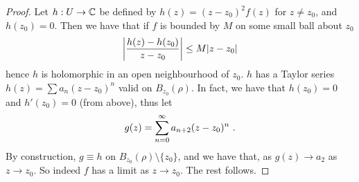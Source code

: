 \begin{proof}
  Let $h : U \rightarrow \CC$ be defined by $h(z)= (z - z_0)^2f(z)$ for $z \neq z_0$, and $h(z_0) = 0$.
Then we have that if $f$ is bounded by $M$ on some small ball about $z_0$
\[
  \abs*{\frac{h(z) - h(z_0)}{z - z_0}} \leq M \abs{z - z_0}
\]
hence $h$ is holomorphic in an open neighbourhood of $z_0$.
$h$ has a Taylor series $h(z) = \sum a_n (z - z_0)^n$ valid on $B_{z_0}(\rho)$.
In fact, we have that $h(z_0) = 0$ and $h'(z_0) = 0$ (from above), thus let
\[
g(z) = \sum_{n=0}^\infty a_{n+2}(z - z_0)^n \mpunct{.}
\]
By construction, $g \equiv h$ on $B_{z_0}(\rho) \setminus \{ z_0 \}$, and we have that, as $g(z) \rightarrow a_2$ as $z \rightarrow z_0$.
So indeed $f$ has a limit as $z \rightarrow z_0$.
The rest follows.
\end{proof}

